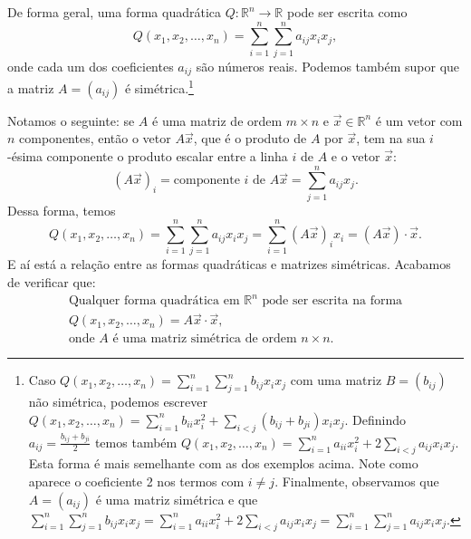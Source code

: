 \documentclass[../livro.tex]{subfiles}
\begin{document}
De forma geral, uma forma quadrática $Q :\mathbb{R}^n \to \mathbb{R}$ pode ser escrita como
\begin{equation}\label{geral}
Q(x_1, x_2, \dots, x_n) = \sum_{i=1}^{n} \sum_{j=1}^{n} a_{ij} x_i x_j,
\end{equation} onde cada um dos coeficientes $a_{ij}$ são números reais. Podemos também supor que a matriz $A = (a_{ij})$ é simétrica.\footnote{Caso  $Q(x_1, x_2, \dots, x_n) = \sum_{i=1}^{n} \sum_{j=1}^{n} b_{ij} x_i x_j$ com uma matriz $B = (b_{ij})$  não  simétrica, podemos escrever $Q(x_1, x_2, \dots, x_n) = \sum_{i=1}^{n} b_{ii} x_i^2 + \sum_{i < j} (b_{ij} + b_{ji}) x_i x_j$. Definindo $a_{ij} = \frac{b_{ij} + b_{ji}}{2}$ temos também $Q(x_1, x_2, \dots, x_n) = \sum_{i=1}^{n} a_{ii} x_i^2 + 2 \sum_{i < j} a_{ij} x_i x_j$. Esta forma é mais semelhante com as dos exemplos acima. Note como aparece o coeficiente 2 nos termos com $i \neq j$. Finalmente, observamos que $A = (a_{ij})$ é uma matriz simétrica e que $\sum_{i=1}^{n} \sum_{j=1}^{n} b_{ij} x_i x_j = \sum_{i=1}^{n} a_{ii} x_i^2 + 2 \sum_{i < j} a_{ij} x_i x_j = \sum_{i=1}^{n} \sum_{j=1}^{n} a_{ij} x_i x_j.$}


Notamos o seguinte: se $A$ é uma matriz de ordem $m \times n$ e $\vec{x} \in \mathbb{R}^n$ é um vetor com $n$ componentes, então o vetor $A \vec{x}$, que é o produto de $A$ por $\vec{x}$, tem na sua $i$-ésima componente o produto escalar entre a linha $i$ de $A$ e o vetor $\vec{x}$:
\begin{equation}
\left( A \vec{x} \right)_i = \text{componente $i$ de } A \vec{x} = \sum_{j=1}^{n} a_{ij} x_j.
\end{equation} Dessa forma, temos
\begin{equation}
Q(x_1, x_2, \dots, x_n) = \sum_{i=1}^{n} \sum_{j=1}^{n} a_{ij} x_i x_j = \sum_{i=1}^{n} \left( A \vec{x} \right)_i x_i  =  \left( A \vec{x} \right) \cdot \vec{x}.
\end{equation} E aí está a relação entre as formas quadráticas e matrizes simétricas. Acabamos de verificar que:
\begin{equation}
\boxed{\begin{array}{c}
	\text{Qualquer forma quadrática em $\mathbb{R}^n$ pode ser escrita na forma} \\
	Q(x_1, x_2, \dots, x_n) = A \vec{x}  \cdot \vec{x}, \\
	\text{onde $A$ é uma matriz simétrica de ordem $n\times n$.}
	\end{array}}
\end{equation}
\end{document}
